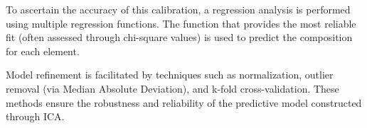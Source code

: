 To ascertain the accuracy of this calibration, a regression analysis is performed using multiple regression functions. The function that provides the most reliable fit (often assessed through chi-square values) is used to predict the composition for each element.

Model refinement is facilitated by techniques such as normalization, outlier removal (via Median Absolute Deviation), and k-fold cross-validation. These methods ensure the robustness and reliability of the predictive model constructed through ICA.